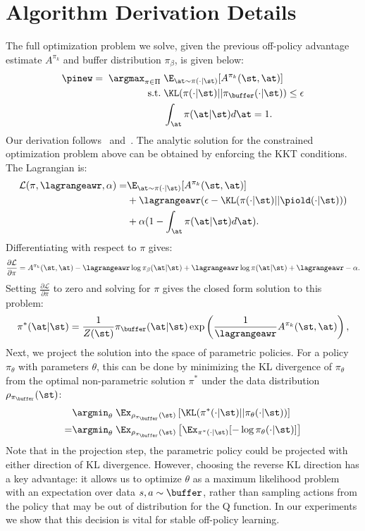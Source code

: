 \section{Algorithm Derivation Details} \label{sec:derivation}

The full optimization problem we solve, given the previous off-policy advantage estimate $A^{\pi_k}$ and buffer distribution $\pi_\beta$, is given below:
\begin{align}
    \pinew = \; \argmax_{\pi \in \Pi} \; & \E_{\at \sim \pi(\cdot|\st)}[A^{\pi_k}(\st, \at)] \\
    \text{s.t.} \; & \KL(\pi(\cdot|\st)||\pi_\buffer(\cdot|\st)) \leq \epsilon \\
    & \int_\at \pi(\at|\st) d\at = 1.
\end{align}
Our derivation follows~\citet{peters2010reps} and~\citet{peng2019awr}. The analytic solution for the constrained optimization problem above can be obtained by enforcing the KKT conditions. The Lagrangian is:
\begin{align}
    \mathcal{L}(\pi, \lagrangeawr, \alpha) = & \E_{\at \sim \pi(\cdot|\st)}[A^{\pi_k}(\st, \at)] \\ & + \lagrangeawr(\epsilon - \KL(\pi(\cdot|\st)||\piold(\cdot|\st))) \\ & + \alpha (1 - \int_\at \pi(\at|\st) d\at).
\end{align}
Differentiating with respect to $\pi$ gives:
\begin{align}
    \frac{\partial \mathcal{L}}{\partial \pi} = A^{\pi_k}(\st, \at) - \lagrangeawr \log \pi_\beta(\at|\st) + \lagrangeawr \log \pi(\at|\st) + \lagrangeawr - \alpha.
\end{align}
Setting $\frac{\partial \mathcal{L}}{\partial \pi}$ to zero and solving for $\pi$ gives the closed form solution to this problem:
\begin{align}
    \label{eqn:closedform}
    \pi^*(\at|\st) = \frac{1}{Z(\st)} \pi_\buffer(\at|\st)\exp\left(\frac{1}{\lagrangeawr} A^{\pi_k}(\st, \at)\right),
\end{align}
Next, we project the solution into the space of parametric policies. For a policy $\pi_\theta$ with parameters $\theta$, this can be done by minimizing the KL divergence of $\pi_{\theta}$ from the optimal non-parametric solution $\pi^*$ under the data distribution $\rho_{\pi_\buffer}(\st)$: 
\begin{align}
    & \argmin_\theta \; \Ex_{\rho_{\pi_\buffer}(\st) } \left[\KL(\pi^*(\cdot|\st)||\pi_\theta(\cdot|\st))\right] \\ = & 
    \argmin_\theta \; \Ex_{\rho_{\pi_\buffer}(\st)} \left[\Ex_{\pi^*(\cdot|\st)}[-\log \pi_\theta(\cdot|\st)]\right]
\end{align}
Note that in the projection step, the parametric policy could be projected with either direction of KL divergence. However, choosing the reverse KL direction has a key advantage: it allows us to optimize $\theta$ as a maximum likelihood problem with an expectation over data $s, a \sim \buffer$, rather than sampling actions from the policy that may be out of distribution for the Q function. In our experiments we show that this decision is vital for stable off-policy learning.

